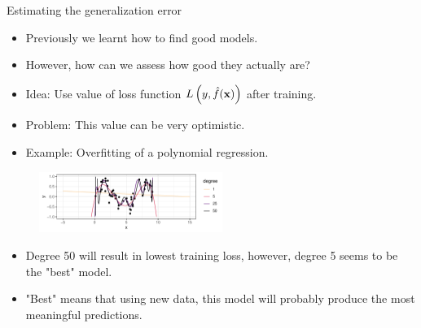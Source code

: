 \documentclass[11pt,compress,t,notes=noshow, xcolor=table]{beamer}
\begin{document}
\begin{vbframe}{Estimating the generalization error}

\begin{itemize}
\item Previously we learnt how to find good models.
\item However, how can we assess how good they actually are?
\item Idea: Use value of loss function $L\left(y, \hat{f}(\mathbf{x})\right)$ after training.
\item Problem: This value can be very optimistic.
\item Example: Overfitting of a polynomial regression.
\end{itemize}

\begin{figure}
\includegraphics[width=0.53\textwidth]{figure/nutshell-overfit}
\end{figure}

\begin{itemize}
\item Degree 50 will result in lowest training loss, however, degree 5 seems to be the "best" model.
\item "Best" means that using new data, this model will probably produce the most meaningful predictions.
\end{itemize}

\framebreak


\end{vbframe}
\end{document}
